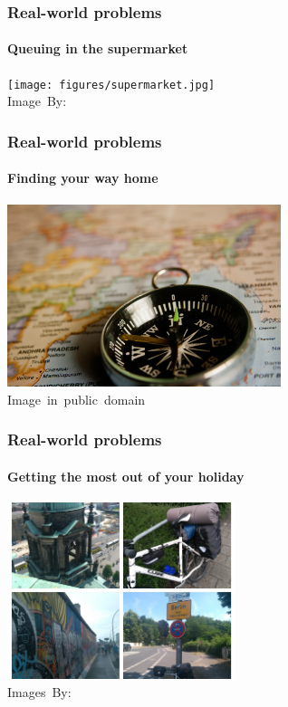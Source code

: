 \begin{frame}
\begin{figure}
\begin{subfigure}{0.45\textwidth}
		\end{subfigure}
		\label{fig:XKCD 1134: Logic boat}
	\end{figure}
\end{frame}

\begin{frame}
	\frametitle{Real-world problems}
	\framesubtitle{Queuing in the supermarket}
	\begin{center}
		\texttt{[image: figures/supermarket.jpg]}\\
		\hspace*{15pt}\hbox{\scriptsize Image By:}
	\end{center}
	
\end{frame}

\begin{frame}
	\frametitle{Real-world problems}
	\framesubtitle{Finding your way home}
	\begin{center}
		\includegraphics[width=0.6\textwidth]{figures/navigation.jpg}\\
		\hspace*{15pt}\hbox{\scriptsize Image in public domain}
	\end{center}

\end{frame}

\begin{frame}
	\frametitle{Real-world problems}
	\framesubtitle{Getting the most out of your holiday}
	\begin{center}
		\includegraphics[width=0.5\textwidth]{figures/holidays.jpg}\\
		\hspace*{15pt}\hbox{\scriptsize Images By:}
	\end{center}
\end{frame}


